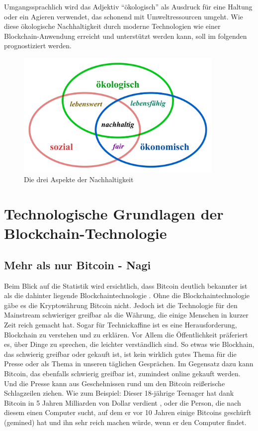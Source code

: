 Umgangssprachlich wird das Adjektiv ``ökologisch'' als Ausdruck für eine Haltung oder ein Agieren verwendet, das schonend mit Umweltressourcen umgeht\cite[13-23]{test123}. Wie diese ökologische Nachhaltigkeit durch moderne Technologien wie einer Blockchain-Anwendung erreicht und unterstützt werden kann, soll im folgenden prognostiziert werden.

\begin{figure}[ht!]
	\centering
	\includegraphics[width=100mm]{nachhaltig.jpg}
	\caption{Die drei Aspekte der Nachhaltigkeit\cite{oekologischeN} \label{overflow}}
\end{figure} 
\chapter{Technologische Grundlagen der Blockchain-Technologie}
\section{Mehr als nur Bitcoin - Nagi}
Beim Blick auf die Statistik wird ersichtlich, dass Bitcoin deutlich bekannter ist als die dahinter liegende Blockchaintechnologie \cite{Gbtcvsbc21}. Ohne die Blockchaintechnologie gäbe es die Kryptowährung Bitcoin nicht. Jedoch ist die Technologie für den Mainstream schwieriger greifbar als die Währung, die einige Menschen in kurzer Zeit reich gemacht hat. Sogar für Technickaffine ist es eine Herausforderung, Blockchain zu verstehen und zu erklären. Vor Allem die Öffentlichkeit präferiert es, über Dinge zu sprechen, die leichter verständlich sind. So etwas wie Blockhain, das schwierig greifbar oder gekauft %
ist, ist kein wirklich gutes Thema für die Presse oder als Thema in unseren täglichen Gesprächen. Im Gegensatz dazu kann Bitcoin, das ebenfalls schwierig greifbar ist, zumindest online gekauft werden. Und die Presse kann aus Geschehnissen rund um den Bitcoin reißerische Schlagzeilen ziehen. Wie zum Beispiel: Dieser 18-jährige Teenager hat dank Bitcoin in 5 Jahren Milliarden von Dollar verdient \cite{Jeff18}, oder die Person, die nach diesem einen Computer sucht, auf dem er vor 10 Jahren einige Bitcoins geschürft (gemined) hat und ihn sehr reich machen würde, wenn er den Computer findet.
\newline 

